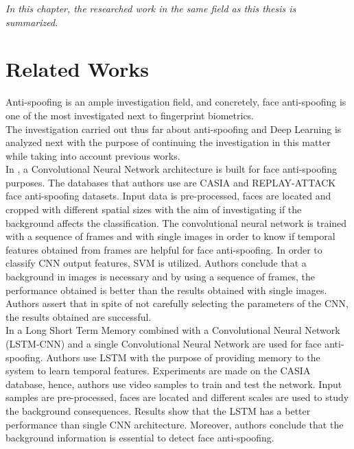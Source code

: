 \begin{small}
\emph{In this chapter, the researched work in the same field as this thesis is summarized.}
\end{small}

\section{Related Works}
Anti-spoofing is an ample investigation field, and concretely, face anti-spoofing is one of the most investigated next to fingerprint biometrics.\\

The investigation carried out thus far about anti-spoofing and Deep Learning is analyzed next with the purpose of continuing the investigation in this matter while taking into account previous works.\\

In \cite{yangLL14}, a Convolutional Neural Network architecture is built for face anti-spoofing purposes.  The databases that authors use are CASIA and REPLAY-ATTACK face anti-spoofing datasets. Input data is pre-processed, faces are located and cropped with different spatial sizes with the aim of investigating if the background affects the classification. The convolutional neural network is trained with a sequence of frames and with single images in order to know if temporal features obtained from frames are helpful for face anti-spoofing. In order to classify CNN output features, SVM is utilized. Authors conclude that a background in images is necessary and by using a sequence of frames, the performance obtained is better than the results obtained with single images. Authors assert that in spite of not carefully selecting the parameters of the CNN, the results obtained are successful. \\

In \cite{LSTM-CNN} a Long Short Term Memory combined with a Convolutional Neural Network (LSTM-CNN) and a single Convolutional Neural Network are used for face anti-spoofing. Authors use LSTM with the purpose of providing memory to the system to learn temporal features. Experiments are made on the CASIA database, hence, authors use video samples to train and test the network. Input samples are pre-processed, faces are located and different scales are used to study the background consequences. Results show that the LSTM has a better performance than single CNN architecture. Moreover, authors conclude that the background information is essential to detect face anti-spoofing.\\

